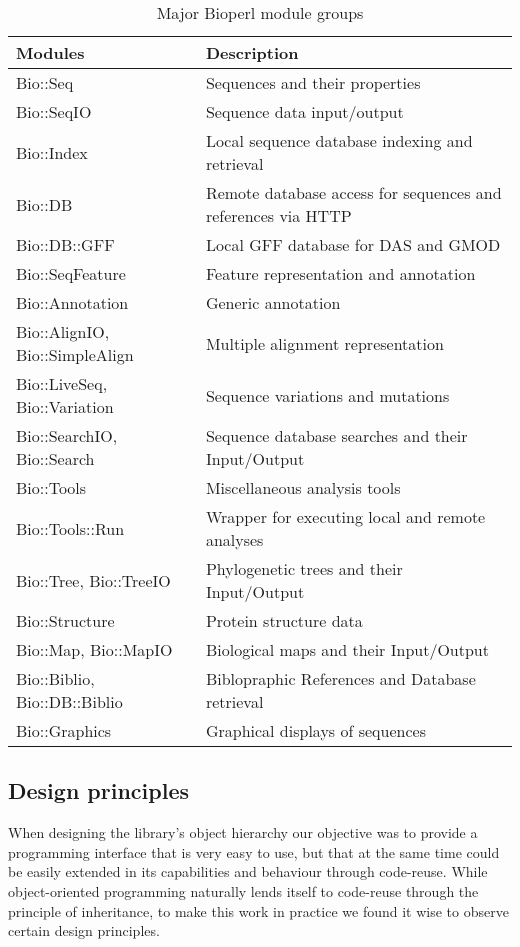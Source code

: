 \documentclass[12pt]{article}
\begin{document}
\begin{table}[p]
\begin{tabular}{|l|l|}
\hline
\textbf{Modules} & \textbf{Description} \\
\hline
Bio::Seq &  Sequences and their properties \\
Bio::SeqIO & Sequence data input/output \\
Bio::Index & Local sequence database indexing and retrieval \\ 
Bio::DB & Remote database access for sequences and references via HTTP \\
Bio::DB::GFF & Local GFF database for DAS and GMOD \\
Bio::SeqFeature & Feature representation and annotation \\
Bio::Annotation & Generic annotation \\
Bio::AlignIO, Bio::SimpleAlign & Multiple alignment representation \\
Bio::LiveSeq, Bio::Variation & Sequence variations and mutations \\
Bio::SearchIO, Bio::Search  & Sequence database searches and their Input/Output \\
Bio::Tools &  Miscellaneous analysis tools \\
Bio::Tools::Run &  Wrapper for executing local and remote analyses \\
Bio::Tree, Bio::TreeIO & Phylogenetic trees and their Input/Output  \\
Bio::Structure & Protein structure data \\
Bio::Map, Bio::MapIO & Biological maps and their Input/Output \\
Bio::Biblio, Bio::DB::Biblio & Biblopraphic References and Database
retrieval \\ 
Bio::Graphics & Graphical displays of sequences \\
\hline
\end{tabular}
\caption{Major Bioperl module groups}
\label{modules}
\end{table}

\subsection{Design principles}

When designing the library's object hierarchy our objective was to
provide a programming interface that is very easy to use, but that at
the same time could be easily extended in its capabilities and behaviour
through code-reuse.  While object-oriented programming naturally lends
itself to code-reuse through the principle of inheritance, to make
this work in practice we found it wise to observe certain design principles.  
\end{document}
